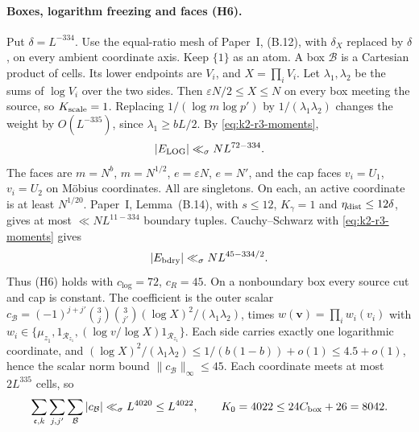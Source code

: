 \paragraph{Boxes, logarithm freezing and faces (H6).}
Put \(\delta=L^{-334}\). Use the equal-ratio mesh of Paper~I, (B.12),
with \(\delta_X\) replaced by \(\delta\), on every ambient coordinate axis.
Keep \(\{1\}\) as an atom. A box \(\mathcal B\) is a Cartesian product
of cells. Its lower endpoints are \(V_i\), and \(X=\prod_iV_i\). Let
\(\lambda_1,\lambda_2\) be the sums of \(\log V_i\) over the two sides.
Then \(\varepsilon N/2\le X\le N\) on every box meeting the source, so
\(K_{\rm scale}=1\). Replacing \(1/(\log m\log p')\) by
\(1/(\lambda_1\lambda_2)\) changes the weight by \(O(L^{-335})\), since
\(\lambda_1\ge bL/2\). By \eqref{eq:k2-r3-moments},
\begin{equation}\label{eq:k2-r3-log}
 |E_{\rm LOG}|\ll_\sigma NL^{72-334}.
\end{equation}
The faces are \(m=N^b\), \(m=N^{1/2}\), \(e=\varepsilon N\), \(e=N'\), and
the cap faces \(v_i=U_1\), \(v_i=U_2\) on Möbius coordinates. All are
singletons. On each, an active coordinate is at least \(N^{1/20}\).
Paper~I, Lemma~(B.14), with \(s\le12\), \(K_\gamma=1\) and
\(\eta_{\rm dist}\le12\delta\), gives at most \(\ll NL^{11-334}\) boundary
tuples. Cauchy--Schwarz with \eqref{eq:k2-r3-moments} gives
\begin{equation}\label{eq:k2-r3-bdry}
 |E_{\rm bdry}|\ll_\sigma NL^{45-334/2}.
\end{equation}
Thus (H6) holds with \(c_{\log}=72\), \(c_R=45\). On a nonboundary box every
source cut and cap is constant. The coefficient is the outer scalar
\(c_{\mathcal B}=(-1)^{j+j'}\binom3j\binom3{j'}(\log X)^2/(\lambda_1\lambda_2)\),
times
\(w(\mathbf v)=\prod_iw_i(v_i)\) with
\(w_i\in\{\mu_{z_1},1_{\mathcal R_{z_1}},(\log v/\log X)1_{\mathcal R_{z_1}}\}\).
Each side carries exactly one logarithmic coordinate, and
\((\log X)^2/(\lambda_1\lambda_2)
\le 1/(b(1-b))+o(1)\le4.5+o(1)\), hence the scalar norm bound
\(\lVert c_{\mathcal B}\rVert_\infty\le45\).
Each coordinate meets at most \(2L^{335}\) cells, so
\begin{equation}\label{eq:k2-total-coefficient-norm}
 \sum_{\mathfrak c,k}\sum_{j,j'}\sum_{\mathcal B}|c_{\mathcal B}|
 \ll_\sigma L^{4020}\le L^{4022},\qquad K_0=4022\le24C_{\rm box}+26=8042.
\end{equation}

